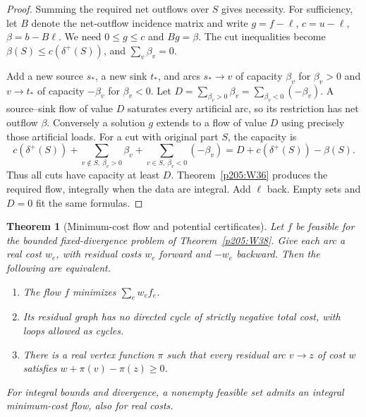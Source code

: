 \documentclass[11pt,oneside,openany]{book}
\theoremstyle{plain}
\newtheorem{theorem}{Theorem}[chapter]
\theoremstyle{definition}
\theoremstyle{remark}
\begin{document}
\begin{proof}
Summing the required net outflows over \(S\) gives necessity.
For sufficiency, let \(B\) denote the net-outflow incidence
matrix and write \(g=f-\ell\), \(c=u-\ell\),
\(\beta=b-B\ell\). We need \(0\le g\le c\) and \(Bg=\beta\).
The cut inequalities become
\(\beta(S)\le c(\delta^+(S))\), and \(\sum_v\beta_v=0\).

Add a new source \(s_*\), a new sink \(t_*\), and arcs
\(s_*\to v\) of capacity \(\beta_v\) for \(\beta_v>0\) and
\(v\to t_*\) of capacity \(-\beta_v\) for \(\beta_v<0\).
Let \(D=\sum_{\beta_v>0}\beta_v=\sum_{\beta_v<0}(-\beta_v)\).
A source--sink flow of value \(D\) saturates every artificial
arc, so its restriction has net outflow \(\beta\). Conversely
a solution \(g\) extends to a flow of value \(D\) using precisely
those artificial loads. For a cut with original part \(S\), the
capacity is
\[
 c(\delta^+(S))
     +\sum_{v\notin S,\ \beta_v>0}\beta_v
     +\sum_{v\in S,\ \beta_v<0}(-\beta_v)
       =D+c(\delta^+(S))-\beta(S).
\]
Thus all cuts have capacity at least \(D\).
Theorem~\ref{p205:W36} produces the required flow, integrally
when the data are integral. Add \(\ell\) back. Empty sets and
\(D=0\) fit the same formulas.
\end{proof}

\begin{theorem}[Minimum-cost flow and potential certificates]\label{p205:W39}
Let \(f\) be feasible for the bounded fixed-divergence problem of
Theorem~\ref{p205:W38}. Give each arc a real cost \(w_e\), with
residual costs \(w_e\) forward and \(-w_e\) backward. Then the
following are equivalent.
\begin{enumerate}
\item The flow \(f\) minimizes \(\sum_e w_ef_e\).
\item Its residual graph has no directed cycle of strictly negative
total cost, with loops allowed as cycles.
\item There is a real vertex function \(\pi\) such that every
residual arc \(v\to z\) of cost \(w\) satisfies
\(w+\pi(v)-\pi(z)\ge0\).
\end{enumerate}
For integral bounds and divergence, a nonempty feasible set admits
an integral minimum-cost flow, also for real costs.
\end{theorem}
\end{document}
